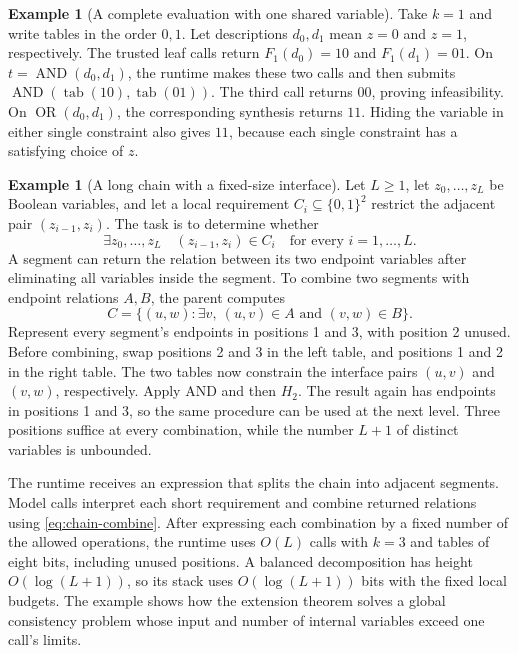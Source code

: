 \documentclass[11pt,twoside]{article}
\newcommand{\tab}{\operatorname{tab}}
\theoremstyle{definition}
\newtheorem{example}[theorem]{Example}
\theoremstyle{remark}
\begin{document}
\begin{example}[A complete evaluation with one shared variable]
\label{ex:one-port}
Take $k=1$ and write tables in the order $0,1$. Let descriptions
$d_0,d_1$ mean $z=0$ and $z=1$, respectively. The trusted leaf calls return
$F_1(d_0)=10$ and $F_1(d_1)=01$. On
$t=\operatorname{AND}(d_0,d_1)$, the runtime makes these two calls and then
submits $\operatorname{AND}(\tab(10),\tab(01))$. The third call returns
$00$, proving infeasibility. On
$\operatorname{OR}(d_0,d_1)$, the corresponding synthesis returns $11$.
Hiding the variable in either single constraint also gives $11$, because
each single constraint has a satisfying choice of $z$.
\end{example}

\begin{example}[A long chain with a fixed-size interface]
\label{ex:constraint-chain}
Let $L\geq1$, let $z_0,\ldots,z_L$ be Boolean variables, and let a local requirement
$C_i\subseteq\{0,1\}^2$ restrict the adjacent pair $(z_{i-1},z_i)$.
The task is to determine whether
\begin{equation}
 \exists z_0,\ldots,z_L\quad
 (z_{i-1},z_i)\in C_i\quad\text{for every }i=1,\ldots,L.
 \label{eq:chain-feasibility}
\end{equation}
A segment can return the relation between its two endpoint variables after
eliminating all variables inside the segment. To combine two segments with
endpoint relations $A,B$, the parent computes
\begin{equation}
 C=\{(u,w):\exists v,\ (u,v)\in A\text{ and }(v,w)\in B\}.
 \label{eq:chain-combine}
\end{equation}
Represent every segment's endpoints in positions 1 and 3, with position 2
unused. Before combining, swap positions 2 and 3 in the left table, and
positions 1 and 2 in the right table. The two tables now constrain
the interface pairs $(u,v)$ and $(v,w)$, respectively. Apply AND and then $H_2$.
The result again has endpoints in positions 1 and 3, so the same procedure
can be used at the next level. Three positions suffice at every combination, while
the number $L+1$ of distinct variables is unbounded.

The runtime receives an expression that splits the chain into adjacent
segments. Model calls interpret each short requirement and combine
returned relations using \eqref{eq:chain-combine}. After expressing each
combination by a fixed number of the allowed operations, the runtime uses
$O(L)$ calls with $k=3$ and tables of eight bits, including unused
positions. A balanced decomposition has height $O(\log(L+1))$, so its
stack uses $O(\log(L+1))$ bits with the fixed local budgets. The example
shows how the extension theorem solves a global consistency problem whose
input and number of internal variables exceed one call's limits.
\end{example}
\end{document}

